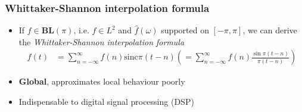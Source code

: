 \documentclass{beamer}
\begin{document}

\begin{frame}
\frametitle{Whittaker-Shannon interpolation formula}
\begin{itemize}
	\item If $f \in \mathbf{BL}(\pi)$, i.e. $f \in L^2$ and $\hat{f}(\omega)$ 
		supported on $[-\pi, \pi]$, we can derive the \textit{Whittaker-Shannon
		interpolation formula}
		\begin{align}
		f(t)	&= \sum_{n=-\infty}^{\infty} f(n) \mathrm{sinc}{\pi(t-n)} \left (
				= \sum_{n=-\infty}^{\infty} f(n) \frac{\sin{\pi(t-n)}}{\pi(t-n)}
				\right )
		\end{align}
	\item \textbf{Global}, approximates local behaviour poorly
	\item Indispensable to digital signal processing (DSP)
\end{itemize}
\end{frame}

\end{document}
